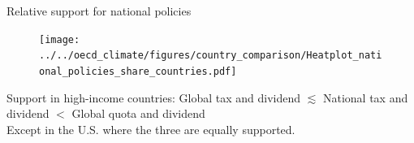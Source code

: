 \documentclass[aspectratio=169,xcolor=dvipsnames, 11pt,mathserif]{beamer}
\begin{document}


\begin{frame}{Relative support for national policies\label{national_policies} \hyperlink{global_policies}{}} 
	\begin{figure}[h!]
	\centering
	\texttt{[image: ../../oecd\_climate/figures/country\_comparison/Heatplot\_national\_policies\_share\_countries.pdf]}
	\end{figure}
    Support in high-income countries: Global tax and dividend $\lesssim$ National tax and dividend $<$ Global quota and dividend \\ Except in the U.S. where the three are equally supported.
\end{frame}
\end{document}
